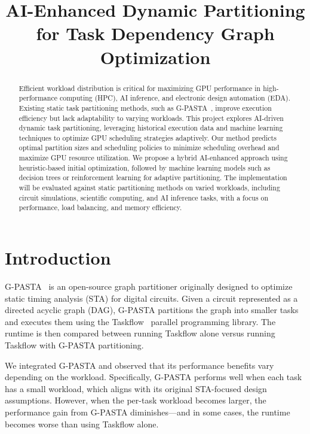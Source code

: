\documentclass[9pt,conference]{IEEEtran}
\begin{document}
\title{AI-Enhanced Dynamic Partitioning for Task Dependency Graph Optimization}
\author{
}
\maketitle
\begin{abstract}
   Efficient workload distribution is critical for maximizing GPU performance in high-performance computing (HPC), AI inference, and electronic design automation (EDA). Existing static task partitioning methods, such as G-PASTA~\cite{zhang2024g}, improve execution efficiency but lack adaptability to varying workloads. This project explores AI-driven dynamic task partitioning, leveraging historical execution data and machine learning techniques to optimize GPU scheduling strategies adaptively. Our method predicts optimal partition sizes and scheduling policies to minimize scheduling overhead and maximize GPU resource utilization. We propose a hybrid AI-enhanced approach using heuristic-based initial optimization, followed by machine learning models such as decision trees or reinforcement learning for adaptive partitioning. The implementation will be evaluated against static partitioning methods on varied workloads, including circuit simulations, scientific computing, and AI inference tasks, with a focus on performance, load balancing, and memory efficiency.
\end{abstract}


\section{Introduction}
G-PASTA~\cite{zhang2024g} is an open-source graph partitioner originally designed to optimize static timing analysis (STA) for digital circuits. 
Given a circuit represented as a directed acyclic graph (DAG), G-PASTA partitions the graph into smaller tasks and executes them using the Taskflow~\cite{huang2021taskflow} parallel programming library. 
The runtime is then compared between running Taskflow alone versus running Taskflow with G-PASTA partitioning.

We integrated G-PASTA and observed that its performance benefits vary depending on the workload. 
Specifically, G-PASTA performs well when each task has a small workload, which aligns with its original STA-focused design assumptions. 
However, when the per-task workload becomes larger, the performance gain from G-PASTA diminishes—and in some cases, the runtime becomes worse than using Taskflow alone.
\end{document}
